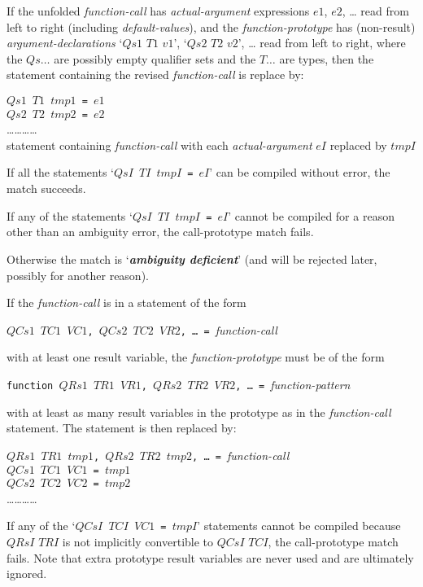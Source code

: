 \documentclass[12pt]{article}
\newcommand{\key}[1]{{\bf \em #1}\index{#1}}
\newenvironment{indpar}[1][0.3in]%
	{\begin{list}{}%
		     {\setlength{\itemsep}{0in}%
		      \setlength{\topsep}{0in}%
		      \setlength{\parsep}{1ex}%
		      \setlength{\labelwidth}{#1}%
		      \setlength{\leftmargin}{#1}%
		      \addtolength{\leftmargin}{\labelsep}}%
	 \item}%
	{\end{list}}
\begin{document}
\begin{enumerate}
\item If the unfolded {\em function-call} has {\em actual-argument}
expressions $e1$, $e2$, \ldots{} read from left to right
(including {\em default-values}),
and the {\em function-prototype} has (non-result)
{\em argument-declarations} `$Qs1$ $T1$ $v1$', `$Qs2$ $T2$ $v2$', \ldots{}
read from left to right, where the $Qs\ldots$ are possibly empty
qualifier sets and the $T\ldots$ are types,
then the statement containing the
revised {\em function-call} is replace by:
\begin{indpar}
{\tt $Qs1$ $T1$ $tmp1$ = $e1$} \\
{\tt $Qs2$ $T2$ $tmp2$ = $e2$} \\
\ldots\ldots\ldots\ldots \\
statement containing {\em function-call}
with each {\em actual-argument} $eI$ replaced by $tmpI$
\end{indpar}

If all the statements `{\tt $QsI$ $TI$ $tmpI$ = $eI$}' can be compiled
without error, the match succeeds.

If any of the statements `{\tt $QsI$ $TI$ $tmpI$ = $eI$}' cannot be compiled
for a reason other than an ambiguity error, the call-prototype match fails.

Otherwise the match is `\key{ambiguity deficient}' (and will be
rejected later, possibly for another reason).

\item \label{FUNCTION-CALL-ASSIGNMENT-COMPILATION}
If the {\em function-call} is in a statement of the form
\begin{center}
{\tt $QCs1$ $TC1$ $VC1$, $QCs2$ $TC2$ $VR2$, \ldots{}~=~}{\em function-call}
\end{center}
with at least one result variable,
the {\em function-prototype} must be of the form
\begin{center}
{\tt function $QRs1$ $TR1$ $VR1$, $QRs2$ $TR2$ $VR2$,
     \ldots{}~=~}{\em function-pattern}
\end{center}
with at least as many result variables in the prototype as in
the {\em function-call} statement.  The statement is then
replaced by:
\begin{indpar}
{\tt $QRs1$ $TR1$ $tmp1$, $QRs2$ $TR2$ $tmp2$,
    \ldots{}~=~}{\em function-call} \\
{\tt $QCs1$ $TC1$ $VC1$ = $tmp1$} \\
{\tt $QCs2$ $TC2$ $VC2$ = $tmp2$} \\
\ldots\ldots\ldots\ldots
\end{indpar}
If any of the `{\tt $QCsI$ $TCI$ $VC1$ = $tmpI$}' statements cannot be
compiled because $QRsI$ $TRI$ is not implicitly convertible
to $QCsI$ $TCI$, the call-prototype match fails.
Note that extra prototype result variables
are never used and are ultimately ignored.


\end{enumerate}
\end{document}
